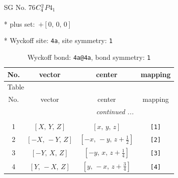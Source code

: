 \documentclass[fleqn,8pt]{jsarticle}
\begin{document}
\setcounter{MaxMatrixCols}{32}

\renewcommand{\tablename}{Table~}
\renewcommand{\figurename}{Figure~}
\begin{center}
\LARGE
SG No. 76\quad$C_{\rm 4}^{2}$\quad$P4_1$\quad[ tetragonal ]
\end{center}

* plus set:\,\,\,$+\left[ 0,\, 0,\, 0 \right]$


* Wyckoff site: {\tt 4a}, site symmetry: {\tt 1}
\renewcommand{\arraystretch}{1.2}
\begin{longtable}{cccc}
\caption{Wyckoff bond: {\tt 4a@4a}, bond symmetry: {\tt 1}}
 \\
 \hline \hline
No. & vector & center & mapping \\ \hline \endfirsthead

\multicolumn{3}{l}{\tablename\ \thetable{}} \\
 \hline \hline
No. & vector & center & mapping \\ \hline \endhead

 \hline \hline
\multicolumn{3}{r}{\footnotesize\it continued ...} \\ \endfoot

 \hline \hline
\multicolumn{3}{r}{} \\ \endlastfoot

1 & $\left[ X,\, Y,\, Z \right]$ & $\left[ x,\, y,\, z \right]$ & {\tt [1]} \\ \hline
2 & $\left[ - X,\, - Y,\, Z \right]$ & $\left[ - x,\, - y,\, z + \frac{1}{2} \right]$ & {\tt [2]} \\ \hline
3 & $\left[ - Y,\, X,\, Z \right]$ & $\left[ - y,\, x,\, z + \frac{1}{4} \right]$ & {\tt [3]} \\ \hline
4 & $\left[ Y,\, - X,\, Z \right]$ & $\left[ y,\, - x,\, z + \frac{3}{4} \right]$ & {\tt [4]} \\
\end{longtable}
\end{document}
